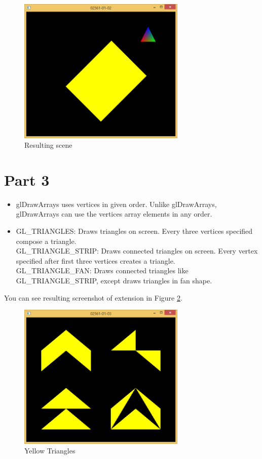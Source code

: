 \begin{figure}[hp]
\centering
\includegraphics[width=8cm]{../Screenshots/ex-1/2.png}
\caption{Resulting scene}
\label{fig:1-2-1}
\end{figure}


\section{Part 3}
\label{sec:del-3}

\begin{itemize}
  \item glDrawArrays uses vertices in given order. Unlike glDrawArrays, glDrawArrays can use the vertices array elements in any order.
  \item GL\_TRIANGLES: Draws triangles on screen. Every three vertices specified compose a triangle.\\
GL\_TRIANGLE\_STRIP: Draws connected triangles on screen. Every vertex specified after first three vertices creates a triangle.\\
GL\_TRIANGLE\_FAN: Draws connected triangles like GL\_TRIANGLE\_STRIP, except draws triangles in fan shape.
\end{itemize}
%
You can see resulting screenshot of extension in Figure \ref{fig:1-3-1}.

\begin{figure}[hp]
\centering
\includegraphics[width=8cm]{../Screenshots/ex-1/3.png}
\caption{Yellow Triangles}
\label{fig:1-3-1}
\end{figure}

